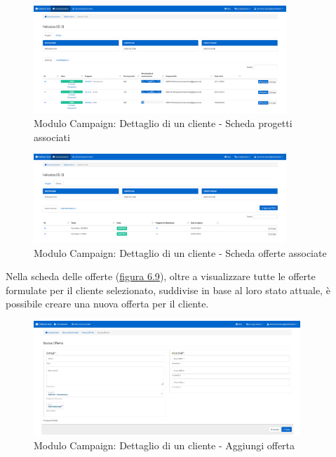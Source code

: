 \begin{figure}[!h]
\centering
\includegraphics[width=360px]{../images/UI/09-dettaglioClienteTab1.png}
\caption{Modulo Campaign: Dettaglio di un cliente - Scheda progetti associati}
\label{fig:dettaglioCliente1}
\end{figure} 

\begin{figure}[!h]
\centering
\includegraphics[width=360px]{../images/UI/09-dettaglioClienteTab2.png}
\caption{Modulo Campaign: Dettaglio di un cliente - Scheda offerte associate}
\label{fig:dettaglioCliente2}
\end{figure}

\noindent Nella scheda delle offerte ({\hyperref[fig:dettaglioCliente2]{figura 6.9}}), oltre a visualizzare tutte le offerte formulate per il cliente selezionato, suddivise in base al loro stato attuale, è possibile creare una nuova offerta per il cliente.

\begin{figure}[!h]
\centering
\includegraphics[width=380px]{../images/UI/10-nuovaOfferta.png}
\caption{Modulo Campaign: Dettaglio di un cliente - Aggiungi offerta}
\label{fig:nuovaOfferta}
\end{figure}

